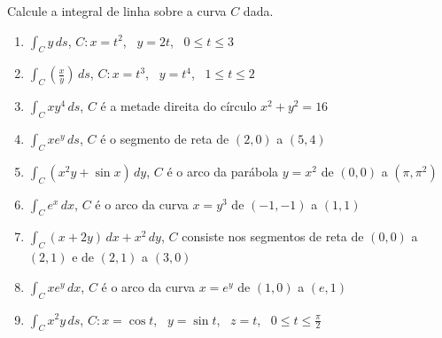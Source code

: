 



	
	
	\vspace{5mm}
	
	Calcule a integral de linha sobre a curva $C$ dada.
	
	\begin{enumerate}
		
		\item $\displaystyle \int_C y \, ds$, \quad $C: x = t^2$, \, $y = 2t$, \, $0 \leq t \leq 3$

		\item $\displaystyle \int_C \left(\frac{x}{y}\right) \, ds$, \quad $C: x = t^3$, \, $y = t^4$, \, $1 \leq t \leq 2$

		\item $\displaystyle \int_C xy^4 \, ds$, \quad $C$ é a metade direita do círculo $x^2 + y^2 = 16$

		\item $\displaystyle \int_C xe^y \, ds$, \quad $C$ é o segmento de reta de $(2,0)$ a $(5,4)$

		\item $\displaystyle \int_C (x^{2}y + \sin x) \, dy$, \quad $C$ é o arco da parábola $y = x^2$ de $(0,0)$ a $(\pi,\pi^2)$

		\item $\displaystyle \int_C e^x \, dx$, \quad $C$ é o arco da curva $x = y^3$ de $(-1,-1)$ a $(1,1)$

		\item $\displaystyle \int_C (x + 2y) \, dx + x^2 \, dy$, \quad $C$ consiste nos segmentos de reta de $(0,0)$ a $(2,1)$ e de $(2,1)$ a $(3,0)$

		\item $\displaystyle \int_C xe^y \, dx$, \quad $C$ é o arco da curva $x = e^y$ de $(1,0)$ a $(e,1)$
		\resposta{\fazer}

		\item $\displaystyle \int_C x^{2}y \, ds$, \quad $C: x = \cos t$, \, $y = \sin t$, \, $z = t$, \, $0 \leq t \leq \frac{\pi}{2}$


\end{enumerate}
